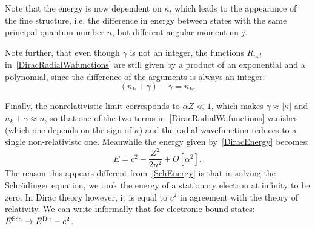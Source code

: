 Note that the energy is now dependent on $\kappa$, which leads to the appearance of the fine structure, i.e. the difference in energy between states with the same principal quantum number $n$, but different angular momentum $j$.

Note further, that even though $\gamma$ is not an integer, the functions $R_{n,l}$ in~\eqref{DiracRadialWafunctions} are still given by a product of an exponential and a polynomial, since the difference of the arguments is always an integer:
\begin{equation}
    (n_k+\gamma)-\gamma = n_k.
\end{equation}

Finally, the nonrelativistic limit corresponds to $\alpha Z \ll 1$, which makes $\gamma \approx |\kappa|$ and $n_k + \gamma \approx n$, so that one of the two terms in~\eqref{DiracRadialWafunctions} vanishes (which one depends on the sign of $\kappa$) and the radial wavefunction reduces to a single non-relativistc one. Meanwhile the energy given by~\eqref{DiracEnergy} becomes:
\begin{equation}
E = c^2-\frac{Z^2}{2n^2} + O[\alpha^2].
\end{equation}
The reason this appears different from~\eqref{SchEnergy} is that in solving the Schr\"odinger equation, we took the energy of a stationary electron at infinity to be zero. In Dirac theory however, it is equal to $c^2$ in agreement with the theory of relativity. We can write informally that for electronic bound states: $E^{\rm{Sch}} \rightarrow E^{\rm{Dir}} - c^2$.




